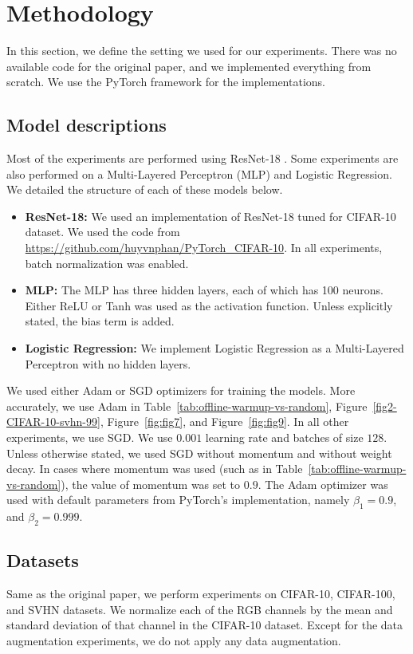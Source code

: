 \section{Methodology}
\label{sec:methodology}
In this section, we define the setting we used for our experiments. There was no available code for the original paper, and we implemented everything from scratch. We use the PyTorch framework for the implementations. 
\subsection{Model descriptions}
Most of the experiments are performed using ResNet-18 \cite{he_deep_2016}. Some experiments are also performed on a Multi-Layered Perceptron (MLP) and Logistic Regression. We detailed the structure of each of these models below.
\begin{itemize}
    \item \textbf{ResNet-18: } We used an implementation of ResNet-18 tuned for CIFAR-10 dataset. We used the code from  \url{https://github.com/huyvnphan/PyTorch_CIFAR-10}. In all experiments, batch normalization \cite{ioffe_batch_2015} was enabled. 
    \item \textbf{MLP: } The MLP has three hidden layers, each of which has 100 neurons. Either ReLU or Tanh was used as the activation function. Unless explicitly stated, the bias term is added.
    \item \textbf{Logistic Regression: } We implement Logistic Regression as a Multi-Layered Perceptron with no hidden layers.
\end{itemize}

We used either Adam or SGD optimizers for training the models. More accurately, we use Adam in Table~\ref{tab:offline-warmup-vs-random}, Figure~\ref{fig2-CIFAR-10-svhn-99}, Figure~\ref{fig:fig7}, and Figure~\ref{fig:fig9}. In all other experiments, we use SGD. We use $0.001$ learning rate and batches of size $128$. Unless otherwise stated, we used SGD without momentum and without weight decay. In cases where momentum was used (such as in Table~\ref{tab:offline-warmup-vs-random}), the value of momentum was set to $0.9$. The Adam optimizer was used with default parameters from PyTorch's implementation, namely $\beta_1 = 0.9$, and $\beta_2 = 0.999$.

%

\subsection{Datasets}
Same as the original paper, we perform experiments on CIFAR-10, CIFAR-100, and SVHN datasets. We normalize each of the RGB channels by the mean and standard deviation of that channel in the CIFAR-10 dataset. Except for the data augmentation experiments, we do not apply any data augmentation.

